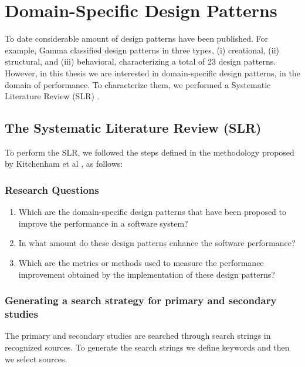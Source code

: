 \section{Domain-Specific Design Patterns}
\label{sec:dsdpModel}

To date considerable amount of design patterns have been published. For example, Gamma \etal{} \cite{Gamma:1995:DesignPatternsBook} classified design patterns in three types, (i) creational, (ii) structural, and (iii) behavioral, characterizing a total of 23 design patterns. However, in this thesis we are interested in domain-specific design patterns, in the domain of performance. To characterize them, we performed a Systematic Literature Review (SLR) \cite{keele2007guidelines}. 

\subsection{The Systematic Literature Review (SLR)}
\label{sec:SLR}
To perform the SLR, we followed the steps defined in the methodology proposed by Kitchenham et al \cite{kitchenham2009systematic}, as follows:

\subsubsection{Research Questions}
\begin{enumerate}
	\item Which are the domain-specific design patterns that have been proposed to improve the performance in a software system?
	\item In what amount do these design patterns enhance the software performance?
	\item Which are the metrics or methods used to measure the performance improvement obtained by the implementation of these design patterns?
	\label{enum1}
\end{enumerate}

\subsubsection{Generating a search strategy for primary and secondary studies}

The primary and secondary studies are searched through search strings in recognized sources. To generate the search strings we define keywords and then we select sources.\\

